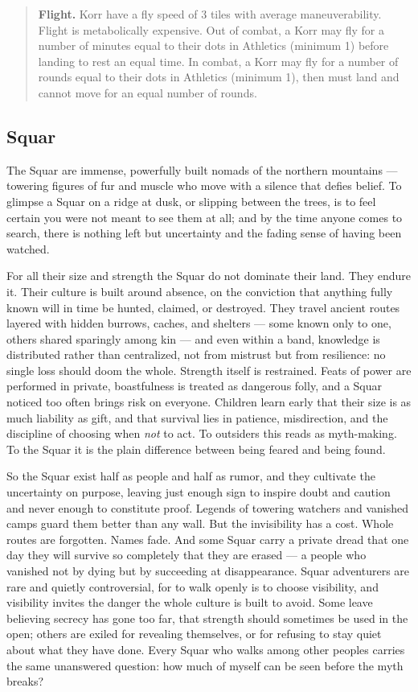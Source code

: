 \begin{quote}
\textbf{Flight.} Korr have a fly speed of 3 tiles with average maneuverability. Flight is metabolically expensive. Out of combat, a Korr may fly for a number of minutes equal to their dots in Athletics (minimum 1) before landing to rest an equal time. In combat, a Korr may fly for a number of rounds equal to their dots in Athletics (minimum 1), then must land and cannot move for an equal number of rounds.
\end{quote}

\subsection{Squar}

The Squar are immense, powerfully built nomads of the northern mountains --- towering figures of fur and muscle who move with a silence that defies belief. To glimpse a Squar on a ridge at dusk, or slipping between the trees, is to feel certain you were not meant to see them at all; and by the time anyone comes to search, there is nothing left but uncertainty and the fading sense of having been watched.

For all their size and strength the Squar do not dominate their land. They endure it. Their culture is built around absence, on the conviction that anything fully known will in time be hunted, claimed, or destroyed. They travel ancient routes layered with hidden burrows, caches, and shelters --- some known only to one, others shared sparingly among kin --- and even within a band, knowledge is distributed rather than centralized, not from mistrust but from resilience: no single loss should doom the whole. Strength itself is restrained. Feats of power are performed in private, boastfulness is treated as dangerous folly, and a Squar noticed too often brings risk on everyone. Children learn early that their size is as much liability as gift, and that survival lies in patience, misdirection, and the discipline of choosing when \textit{not} to act. To outsiders this reads as myth-making. To the Squar it is the plain difference between being feared and being found.

So the Squar exist half as people and half as rumor, and they cultivate the uncertainty on purpose, leaving just enough sign to inspire doubt and caution and never enough to constitute proof. Legends of towering watchers and vanished camps guard them better than any wall. But the invisibility has a cost. Whole routes are forgotten. Names fade. And some Squar carry a private dread that one day they will survive so completely that they are erased --- a people who vanished not by dying but by succeeding at disappearance. Squar adventurers are rare and quietly controversial, for to walk openly is to choose visibility, and visibility invites the danger the whole culture is built to avoid. Some leave believing secrecy has gone too far, that strength should sometimes be used in the open; others are exiled for revealing themselves, or for refusing to stay quiet about what they have done. Every Squar who walks among other peoples carries the same unanswered question: how much of myself can be seen before the myth breaks?


